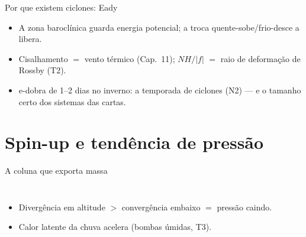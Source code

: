 \documentclass[aspectratio=169,11pt]{beamer}
\begin{document}
\begin{frame}{Por que existem ciclones: Eady}
  \vspace{0.5em}
  \begin{itemize}
    \item A zona baroclínica guarda energia potencial; a troca
          quente-sobe/frio-desce a libera.
    \item Cisalhamento $=$ vento térmico (Cap.~11); $NH/|f|$ $=$ raio
          de deformação de Rossby (T2).
    \item e-dobra de 1--2 dias no inverno: a temporada de ciclones
          (N2) — e o tamanho certo dos sistemas das cartas.
  \end{itemize}
\end{frame}

\section{Spin-up e tendência de pressão}

\begin{frame}{A coluna que exporta massa}
  \begin{columns}
    \vspace{0.4em}
    \begin{itemize}
      \item Divergência em altitude $>$ convergência embaixo $=$
            pressão caindo.
      \item Calor latente da chuva acelera (bombas úmidas, T3).
    \end{itemize}
  \end{columns}
\end{frame}
\end{document}
